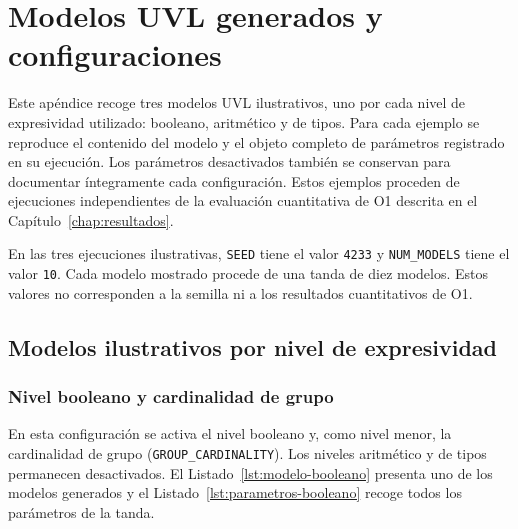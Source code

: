 \chapter{Modelos UVL generados y configuraciones}
\label{app:apendice_a}

Este apéndice recoge tres modelos UVL ilustrativos, uno por cada nivel de
expresividad utilizado: booleano, aritmético y de tipos. Para cada ejemplo se
reproduce el contenido del modelo y el objeto completo de parámetros
registrado en su ejecución. Los parámetros desactivados también se conservan
para documentar íntegramente cada configuración. Estos ejemplos proceden de
ejecuciones independientes de la evaluación cuantitativa de O1 descrita en el
Capítulo~\ref{chap:resultados}.

En las tres ejecuciones ilustrativas, \texttt{SEED} tiene el valor
\texttt{4233} y \texttt{NUM\_MODELS} tiene el valor \texttt{10}. Cada modelo
mostrado procede de una tanda de diez modelos. Estos valores no corresponden
a la semilla ni a los resultados cuantitativos de O1.

\section{Modelos ilustrativos por nivel de expresividad}
\label{app:modelos-o1}

\subsection{Nivel booleano y cardinalidad de grupo}
\label{app:modelo-uvl}

En esta configuración se activa el nivel booleano y, como nivel menor, la
cardinalidad de grupo (\texttt{GROUP\_CARDINALITY}). Los niveles aritmético y
de tipos permanecen desactivados. El Listado~\ref{lst:modelo-booleano}
presenta uno de los modelos generados y el
Listado~\ref{lst:parametros-booleano} recoge todos los parámetros de la tanda.

